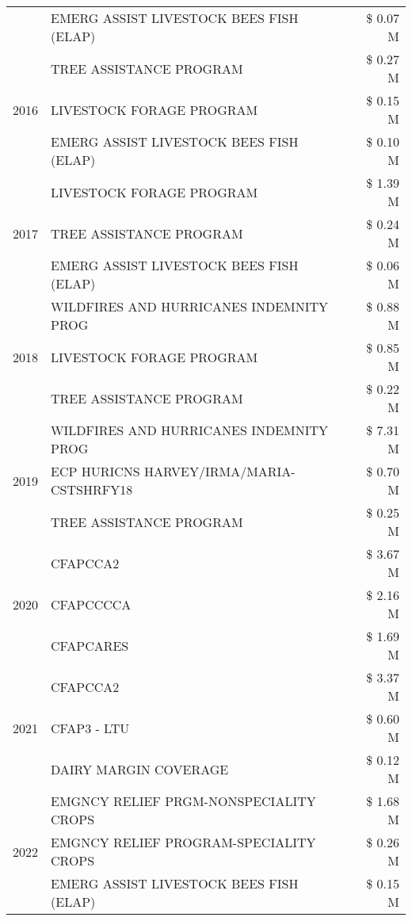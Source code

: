 \begin{tabular}{llr}
 & EMERG ASSIST LIVESTOCK BEES FISH (ELAP) & \$ 0.07 M \\
\cline{1-3}
\multirow[t]{3}{*}{2016} & TREE ASSISTANCE PROGRAM & \$ 0.27 M \\
 & LIVESTOCK FORAGE PROGRAM & \$ 0.15 M \\
 & EMERG ASSIST LIVESTOCK BEES FISH (ELAP) & \$ 0.10 M \\
\cline{1-3}
\multirow[t]{3}{*}{2017} & LIVESTOCK FORAGE PROGRAM & \$ 1.39 M \\
 & TREE ASSISTANCE PROGRAM & \$ 0.24 M \\
 & EMERG ASSIST LIVESTOCK BEES FISH (ELAP) & \$ 0.06 M \\
\cline{1-3}
\multirow[t]{3}{*}{2018} & WILDFIRES AND HURRICANES INDEMNITY PROG & \$ 0.88 M \\
 & LIVESTOCK FORAGE PROGRAM & \$ 0.85 M \\
 & TREE ASSISTANCE PROGRAM & \$ 0.22 M \\
\cline{1-3}
\multirow[t]{3}{*}{2019} & WILDFIRES AND HURRICANES INDEMNITY PROG & \$ 7.31 M \\
 & ECP HURICNS HARVEY/IRMA/MARIA-CSTSHRFY18 & \$ 0.70 M \\
 & TREE ASSISTANCE PROGRAM & \$ 0.25 M \\
\cline{1-3}
\multirow[t]{3}{*}{2020} & CFAPCCA2 & \$ 3.67 M \\
 & CFAPCCCCA & \$ 2.16 M \\
 & CFAPCARES & \$ 1.69 M \\
\cline{1-3}
\multirow[t]{3}{*}{2021} & CFAPCCA2 & \$ 3.37 M \\
 & CFAP3 - LTU & \$ 0.60 M \\
 & DAIRY MARGIN COVERAGE & \$ 0.12 M \\
\cline{1-3}
\multirow[t]{3}{*}{2022} & EMGNCY RELIEF PRGM-NONSPECIALITY CROPS & \$ 1.68 M \\
 & EMGNCY RELIEF PROGRAM-SPECIALITY CROPS & \$ 0.26 M \\
 & EMERG ASSIST LIVESTOCK BEES FISH (ELAP) & \$ 0.15 M \\
\cline{1-3}
\bottomrule
\end{tabular}
